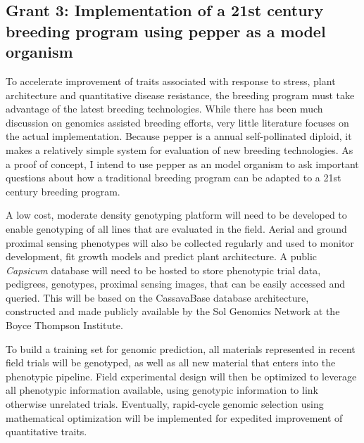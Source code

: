 \documentclass[11pt]{article}
\begin{document}











\subsection*{Grant 3: Implementation of a 21st century breeding program using pepper as a model organism}

To accelerate improvement of traits associated with response to stress, plant architecture and quantitative disease resistance, the breeding program must take advantage of the latest breeding technologies. While there has been much discussion on genomics assisted breeding efforts, very little literature focuses on the actual implementation. Because pepper is a annual self-pollinated diploid, it makes a relatively simple system for evaluation of new breeding technologies. As a proof of concept, I intend to use pepper as an model organism to ask important questions about how a traditional breeding program can be adapted to a 21st century breeding program. 

A low cost, moderate density genotyping platform will need to be developed to enable genotyping of all lines that are evaluated in the field. Aerial and ground proximal sensing phenotypes will also be collected regularly and used to monitor development, fit growth models and predict plant architecture. A public \emph{Capsicum} database will need to be hosted to store phenotypic trial data, pedigrees, genotypes, proximal sensing images, that can be easily accessed and queried. This will be based on the CassavaBase database architecture, constructed and made publicly available by the Sol Genomics Network at the Boyce Thompson Institute. 

To build a training set for genomic prediction, all materials represented in recent field trials will be genotyped, as well as all new material that enters into the phenotypic pipeline. Field experimental design will then be optimized to leverage all phenotypic information available, using genotypic information to link otherwise unrelated trials. Eventually, rapid-cycle genomic selection using mathematical optimization will be implemented for expedited improvement of quantitative traits.
\end{document}
